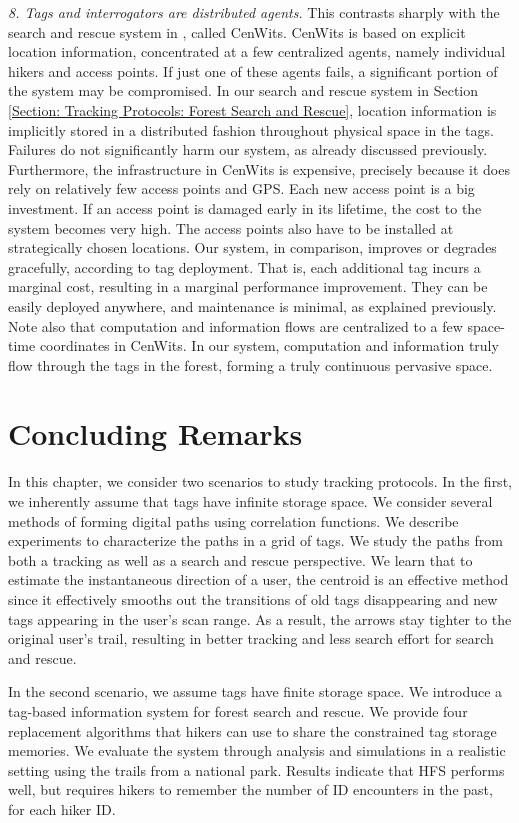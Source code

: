 \emph{8. Tags and interrogators are distributed agents.} This contrasts sharply with the search and rescue system in \cite{2005 Huang}, called CenWits. CenWits is based on explicit location information, concentrated at a few centralized agents, namely individual hikers and access points. If just one of these agents fails, a significant portion of the system may be compromised. In our search and rescue system in Section \ref{Section: Tracking Protocols: Forest Search and Rescue}, location information is implicitly stored in a distributed fashion throughout physical space in the tags. Failures do not significantly harm our system, as already discussed previously. Furthermore, the infrastructure in CenWits is expensive, precisely because it does rely on relatively few access points and GPS. Each new access point is a big investment. If an access point is damaged early in its lifetime, the cost to the system becomes very high. The access points also have to be installed at strategically chosen locations. Our system, in comparison, improves or degrades gracefully, according to tag deployment. That is, each additional tag incurs a marginal cost, resulting in a marginal performance improvement. They can be easily deployed anywhere, and maintenance is minimal, as explained previously. Note also that computation and information flows are centralized to a few space-time coordinates in CenWits. In our system, computation and information truly flow through the tags in the forest, forming a truly continuous pervasive space.

\section{Concluding Remarks}
In this chapter, we consider two scenarios to study tracking protocols. In the first, we inherently assume that tags have infinite storage space. We consider several methods of forming digital paths using correlation functions. We describe experiments to characterize the paths in a grid of tags. We study the paths from both a tracking as well as a search and rescue perspective. We learn that to estimate the instantaneous direction of a user, the centroid is an effective method since it effectively smooths out the transitions of old tags disappearing and new tags appearing in the user's scan range. As a result, the arrows stay tighter to the original user's trail, resulting in better tracking and less search effort for search and rescue.

In the second scenario, we assume tags have finite storage space. We introduce a tag-based information system for forest search and rescue.  We provide four replacement algorithms that hikers can use to share the constrained tag storage memories.  We evaluate the system through analysis and simulations in a realistic setting using the trails from a national park.  Results indicate that HFS performs well, but requires hikers to remember the number of ID encounters in the past, for each hiker ID.


